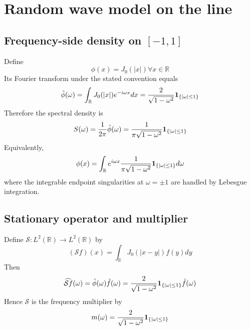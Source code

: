 \documentclass{article}
\newcommand{\tmtextbf}[1]{\text{{\bfseries{#1}}}}
\begin{document}
\section{Random wave model on the line}

\subsection{Frequency-side density on $[- 1, 1]$}

Define
\begin{equation}
  \phi (x) = J_0 (|x|) \forall x \in \mathbb{R}
\end{equation}
Its Fourier transform under the stated convention equals
\begin{equation}
  \hat{\phi} (\omega) = \int_{\mathbb{R}} J_0 (|x|) e^{- i \omega x} dx =
  \frac{2}{\sqrt{1 - \omega^2}} \text{\tmtextbf{1}}_{\{| \omega | \le 1\}}
\end{equation}
Therefore the spectral density is
\begin{equation}
  S (\omega) = \frac{1}{2 \pi}  \hat{\phi} (\omega) = \frac{1}{\pi \sqrt{1 -
  \omega^2}} \text{\tmtextbf{1}}_{\{| \omega | \le 1\}}
\end{equation}
Equivalently,
\begin{equation}
  \phi (x) = \int_{\mathbb{R}} e^{i \omega x}  \frac{1}{\pi \sqrt{1 -
  \omega^2}}  \text{\tmtextbf{1}}_{\{| \omega | \le 1\}} d \omega
\end{equation}
where the integrable endpoint singularities at $\omega = \pm 1$ are handled by
Lebesgue integration.

\subsection{Stationary operator and multiplier}

Define $\mathcal{S}: L^2 (\mathbb{R}) \to L^2 (\mathbb{R})$ by
\begin{equation}
  (\mathcal{S}f) (x) = \int_{\mathbb{R}} J_0 (|x - y|) f (y) dy
\end{equation}
Then
\begin{equation}
  \widehat{\mathcal{S}f} (\omega) = \hat{\phi} (\omega)  \hat{f} (\omega) =
  \frac{2}{\sqrt{1 - \omega^2}}  \text{\tmtextbf{1}}_{\{| \omega | \le 1\}}
  \hat{f} (\omega)
\end{equation}
Hence $\mathcal{S}$ is the frequency multiplier by
\begin{equation}
  m (\omega) = \frac{2}{\sqrt{1 - \omega^2}} \text{\tmtextbf{1}}_{\{| \omega |
  \le 1\}}
\end{equation}
\end{document}
